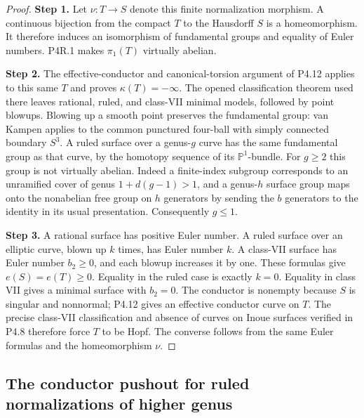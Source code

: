 \begin{proof}
\noindent\textbf{Step 1.} Let $\nu:T\to S$ denote this finite normalization morphism.
A continuous bijection from the compact $T$ to the Hausdorff
$S$ is a homeomorphism. It therefore induces an isomorphism
of fundamental groups and equality of Euler numbers. P4R.1
makes $\pi_1(T)$ virtually abelian.

\noindent\textbf{Step 2.} The effective-conductor and canonical-torsion argument of
P4.12 applies to this same $T$ and proves $\kappa(T)=-\infty$.
The opened classification theorem used there leaves rational,
ruled, and class-VII minimal models, followed by point blowups.
Blowing up a smooth point preserves the fundamental group:
van Kampen applies to the common punctured four-ball with
simply connected boundary $S^3$. A ruled surface over a
genus-$g$ curve has the same fundamental group as that curve,
by the homotopy sequence of its $\mathbb P^1$-bundle.
For $g\ge2$ this group is not virtually abelian. Indeed a
finite-index subgroup corresponds to an unramified cover
of genus $1+d(g-1)>1$, and a genus-$h$ surface group maps
onto the nonabelian free group on $h$ generators by sending
the $b$ generators to the identity in its usual presentation.
Consequently $g\le1$.

\noindent\textbf{Step 3.} A rational surface has positive Euler number. A ruled surface
over an elliptic curve, blown up $k$ times, has Euler number
$k$. A class-VII surface has Euler number $b_2\ge0$, and
each blowup increases it by one. These formulas give
$e(S)=e(T)\ge0$. Equality in the ruled case is exactly
$k=0$. Equality in class VII gives a minimal surface with
$b_2=0$. The conductor is nonempty because $S$ is singular
and nonnormal; P4.12 gives an effective conductor curve on
$T$. The precise class-VII classification and absence of
curves on Inoue surfaces verified in P4.8 therefore force
$T$ to be Hopf. The converse follows from the same Euler
formulas and the homeomorphism $\nu$.
\end{proof}

\subsection{The conductor pushout for ruled normalizations of higher genus}

